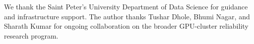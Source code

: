 \documentclass[sigconf]{acmart}
\begin{document}
\begin{acks}
We thank the Saint Peter's University Department of Data Science for guidance and infrastructure support. The author thanks Tushar Dhole, Bhumi Nagar, and Sharath Kumar for ongoing collaboration on the broader GPU-cluster reliability research program.
\end{acks}



\end{document}
